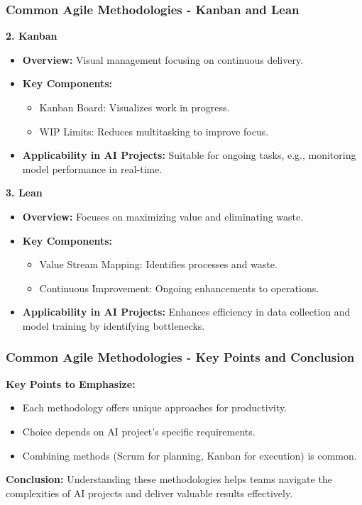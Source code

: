 \documentclass{beamer}
\begin{document}
\begin{frame}[fragile]
    \frametitle{Common Agile Methodologies - Kanban and Lean}
    \textbf{2. Kanban}  
    \begin{itemize}
        \item \textbf{Overview:}  
        Visual management focusing on continuous delivery.
        
        \item \textbf{Key Components:}
        \begin{itemize}
            \item Kanban Board: Visualizes work in progress.
            \item WIP Limits: Reduces multitasking to improve focus.
        \end{itemize}
        
        \item \textbf{Applicability in AI Projects:}  
        Suitable for ongoing tasks, e.g., monitoring model performance in real-time.
    \end{itemize}

    \textbf{3. Lean}  
    \begin{itemize}
        \item \textbf{Overview:}  
        Focuses on maximizing value and eliminating waste.
        
        \item \textbf{Key Components:}
        \begin{itemize}
            \item Value Stream Mapping: Identifies processes and waste.
            \item Continuous Improvement: Ongoing enhancements to operations.
        \end{itemize}
        
        \item \textbf{Applicability in AI Projects:}  
        Enhances efficiency in data collection and model training by identifying bottlenecks.
    \end{itemize}
\end{frame}

\begin{frame}[fragile]
    \frametitle{Common Agile Methodologies - Key Points and Conclusion}
    \textbf{Key Points to Emphasize:}
    \begin{itemize}
        \item Each methodology offers unique approaches for productivity.
        \item Choice depends on AI project's specific requirements.
        \item Combining methods (Scrum for planning, Kanban for execution) is common.
    \end{itemize}

    \textbf{Conclusion:}  
    Understanding these methodologies helps teams navigate the complexities of AI projects and deliver valuable results effectively.
\end{frame}
\end{document}
